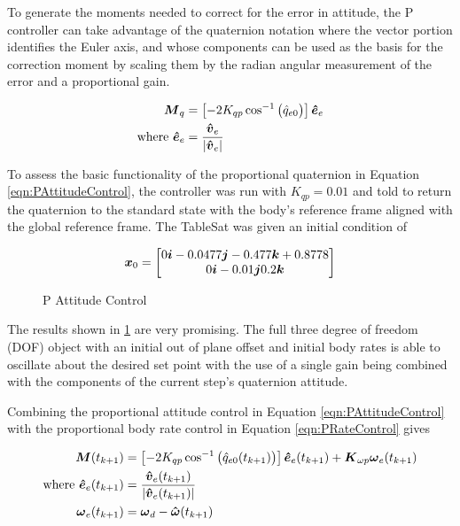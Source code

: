 To generate the moments needed to correct for the error in attitude, the P controller can take advantage of the quaternion notation where the vector portion identifies the Euler axis, and whose components can be used as the basis for the correction moment by scaling them by the radian angular measurement of the error and a proportional gain.

\begin{subequations}
  \begin{align}
    \boldsymbol{M}_{q} &= \left[-2 K_{qp} \cos^{-1} \big(\hat{q}_{e0} \big) \right] \boldsymbol{\hat{e}}_e \\
    \text{where } \boldsymbol{\hat{e}}_e &= \frac{\boldsymbol{\hat{v}}_e}{|\boldsymbol{\hat{v}}_e|}
  \end{align}
  \label{eqn:PAttitudeControl}
\end{subequations}

To assess the basic functionality of the proportional quaternion in Equation \ref{eqn:PAttitudeControl}, the controller was run with $K_{qp} = 0.01$ and told to return the quaternion to the standard state with the body's reference frame aligned with the global reference frame.  The TableSat was given an initial condition of

\begin{equation}
  \boldsymbol{x}_0 = \begin{bmatrix} 0 \boldsymbol{i} -0.0477 \boldsymbol{j} -0.477 \boldsymbol{k} +0.8778 \\ 0 \boldsymbol{i} -0.01 \boldsymbol{j} 0.2 \boldsymbol{k} \end{bmatrix}
\end{equation}


\begin{figure}[H]
  \centerline{}
  \caption{P Attitude Control}
  \label{fig:PAttitudeControl}
\end{figure}

The results shown in \ref{fig:PAttitudeControl} are very promising.  The full three degree of freedom (DOF) object with an initial out of plane offset and initial body rates is able to oscillate about the desired set point with the use of a single gain being combined with the components of the current step's quaternion attitude.

Combining the proportional attitude control in Equation \ref{eqn:PAttitudeControl} with the proportional body rate control in Equation \ref{eqn:PRateControl} gives

\begin{subequations}
  \begin{align}
    \boldsymbol{M}(t_{k+1}) &= \left[-2 K_{qp} \cos^{-1} \big(\hat{q}_{e0}(t_{k+1}) \big) \right] \boldsymbol{\hat{e}}_e(t_{k+1}) + \boldsymbol{K}_{\omega p} \boldsymbol{\omega}_e(t_{k+1})\\
    \text{where } \boldsymbol{\hat{e}}_e(t_{k+1}) &= \frac{\boldsymbol{\hat{v}}_e(t_{k+1})}{|\boldsymbol{\hat{v}}_e(t_{k+1})|} \\
    \boldsymbol{\omega}_e(t_{k+1}) &= \boldsymbol{\omega}_d - \boldsymbol{\hat{\omega}}(t_{k+1})
  \end{align}
  \label{eqn:PAttitudeAndRateControl}
\end{subequations}

